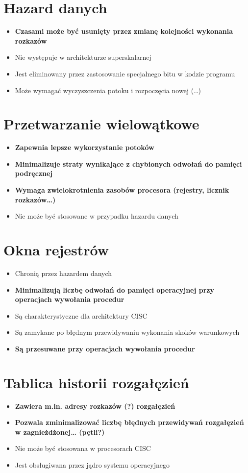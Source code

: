 \documentclass[a4paper,twoside]{article}
\begin{document}
\section{Hazard danych}
	\begin{itemize}
    \item \textbf{Czasami może być usunięty przez zmianę kolejności wykonania rozkazów}
    \item Nie występuje w architekturze superskalarnej
    \item Jest eliminowany przez zastosowanie specjalnego bitu w kodzie programu
    \item Może wymagać wyczyszczenia potoku i rozpoczęcia nowej (…)
    \end{itemize}

\section{Przetwarzanie wielowątkowe}
	\begin{itemize}
    \item \textbf{Zapewnia lepsze wykorzystanie potoków}
    \item \textbf{Minimalizuje straty wynikające z chybionych odwołań do pamięci podręcznej}
    \item \textbf{Wymaga zwielokrotnienia zasobów procesora (rejestry, licznik rozkazów…)}
    \item Nie może być stosowane w przypadku hazardu danych
    \end{itemize}

\section{Okna rejestrów}
	\begin{itemize}
    \item Chronią przez hazardem danych
    \item \textbf{Minimalizują liczbę odwołań do pamięci operacyjnej przy operacjach wywołania procedur}
    \item Są charakterystyczne dla architektury CISC
    \item Są zamykane po błędnym przewidywaniu wykonania skoków warunkowych
    \item \textbf{Są przesuwane przy operacjach wywołania procedur}
    \end{itemize}

\section{Tablica historii rozgałęzień}
	\begin{itemize}
    \item \textbf{Zawiera m.in. adresy rozkazów (?) rozgałęzień}
    \item \textbf{Pozwala zminimalizować liczbę błędnych przewidywań rozgałęzień w zagnieżdżonej… (pętli?)}
    \item Nie może być stosowana w procesorach CISC
    \item Jest obsługiwana przez jądro systemu operacyjnego
    \end{itemize}
\end{document}
